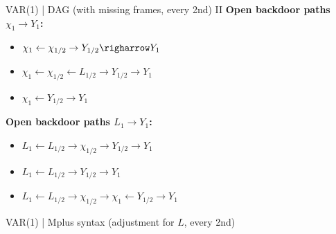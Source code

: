 \documentclass[aspectratio=169, xcolor=dvipsnames]{beamer} %
\begin{document}

\begin{frame}{VAR(1) | DAG (with missing frames, every 2nd) II}
    \textbf{Open backdoor paths $\chi_{1} \rightarrow Y_{1}$:}
    \begin{itemize}
        \item $\chi_{1} \leftarrow \chi_{1/2} \rightarrow Y_{1/2} \righarrow Y_{1}$
        \item $\chi_{1} \leftarrow \chi_{1/2} \leftarrow L_{1/2} \rightarrow Y_{1/2} \rightarrow Y_{1}$
        \item $\chi_{1} \leftarrow Y_{1/2} \rightarrow Y_{1}$
    \end{itemize}
    \bigskip
    \textbf{Open backdoor paths $L_{1} \rightarrow Y_{1}$:}
    \begin{itemize}
        \item $L_{1} \leftarrow L_{1/2} \rightarrow \chi_{1/2} \rightarrow Y_{1/2} \rightarrow Y_{1}$
        \item $L_{1} \leftarrow L_{1/2} \rightarrow Y_{1/2} \rightarrow Y_{1}$
        \item $L_{1} \leftarrow L_{1/2} \rightarrow \chi_{1/2} \rightarrow \chi_{1} \leftarrow Y_{1/2} \rightarrow Y_{1}$
    \end{itemize}
\end{frame}


\begin{frame}{VAR(1) | Mplus syntax (adjustment for $L$, every 2nd)}
    \begin{table}
        \setlength\extrarowheight{2pt}
        \begin{center}
        \end{center}
    \end{table}
\end{frame}
\end{document}

